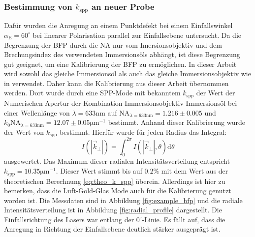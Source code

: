 \documentclass[titlepage]{article}
\begin{document}
	\subsubsection{Bestimmung von  $k_{\mathrm{spp}}$ an neuer Probe}
	Dafür wurden die Anregung an einem Punktdefekt bei einem Einfallswinkel $\alpha_{\mathrm{E}} = 60^\circ$ bei linearer Polarisation parallel zur Einfallsebene untersucht. Da die Begrenzung der BFP durch die NA nur vom Imersionsobjektiv und dem Brechungsindex des verwendeten Immersionsöls abhängt, ist diese Begrenzung gut geeignet, um eine Kalibrierung der BFP zu ermöglichen. In dieser Arbeit wird sowohl das gleiche Immersionsöl als auch das gleiche Immersionsobjektiv wie in\cite{Jaruschewski.2020} verwendet. Daher kann die Kalibrierung aus dieser Arbeit übernommen werden. Dort wurde durch eine SPP-Mode mit bekanntem $k_{\mathrm{spp}}$ der Wert der Numerischen Apertur der Kombination Immersionsobjektiv-Immersionsöl bei einer Wellenlänge von $\lambda=633\mathrm{nm}$ auf $\mathrm{NA}_{\lambda = 633 \mathrm{nm}} = 1.216 \pm 0.005$  und $k_0\mathrm{NA}_{\lambda = 633 \mathrm{nm}} = 12.07 \pm 0.05\mathrm{\mu m}^{-1}$ bestimmt. Anhand dieser Kalibrierung wurde der Wert von $k_{\mathrm{spp}}$ bestimmt. Hierfür wurde für jeden Radius das Integral:
	$$ I\left(|\vec{k}_{\bot}|\right) = \int_{0}^{2 \pi} I\left(|\vec{k}_{\bot}|, \theta\right)\mathrm{d}\theta$$
	ausgewertet. Das Maximum dieser radialen Intensitätsverteilung entspricht $k_{\mathrm{spp}} = 10.35\mathrm{\mu m}^{-1}$.
	Dieser Wert stimmt bis auf $0.2\%$ mit dem Wert aus der theoretischen Berechnung \eqref{eq:theo_k_spp} überein. Allerdings ist hier zu bemerken, dass die Luft-Gold-Glas Mode auch für die Kalibrierung genutzt worden ist. Die Messdaten sind in Abbildung \ref{fig:example_bfp} und die radiale Intensitätsverteilung ist in Abbildung \ref{fig:radial_profile} dargestellt. Die Einfallsrichtung des Lasers war entlang der $0^\circ$-Linie. Es fällt auf, dass die Anregung in Richtung der Einfallsebene deutlich stärker ausgeprägt ist. 
\end{document}
